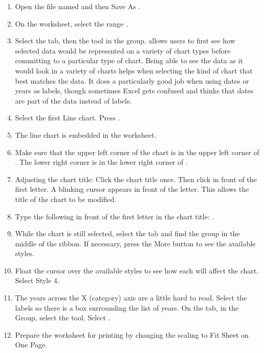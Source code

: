 \begin{enumerate}
	\item Open the file named  and then Save As .
	\item On the  worksheet, select the range .
	\item Select the  tab, then the  tool in the  group.  allows users to first see how selected data would be represented on a variety of chart types before committing to a particular type of chart. Being able to see the data as it would look in a variety of charts helps when selecting the kind of chart that best matches the data. It does a particularly good job when using dates or years as labels, though sometimes Excel gets confused and thinks that dates are part of the data instead of labels.
	\item Select the first Line chart. Press .
	\item The line chart is embedded in the  worksheet.
	\item Make sure that the upper left corner of the chart is in the upper left corner of . The lower right corner is in the lower right corner of .
	\item Adjusting the chart title: Click the chart title once. Then click in front of the first letter. A blinking cursor appears in front of the letter. This allows the title of the chart to be modified.
	\item Type the following in front of the first letter in the chart title: .
	\item While the chart is still selected, select the  tab and find the  group in the middle of the ribbon. If necessary, press the More button to see the available styles.
	\item Float the cursor over the available styles to see how each will affect the chart. Select Style $ 4 $.
	\item The years across the X (category) axis are a little hard to read. Select the labels so there is a box surrounding the list of years. On the  tab, in the  Group, select the  tool. Select .
	\item Prepare the  worksheet for printing by changing the scaling to Fit Sheet on One Page.
\end{enumerate}

